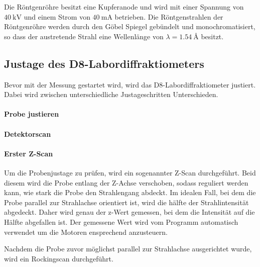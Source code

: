 Die Röntgenröhre besitzt eine Kupferanode und wird mit einer Spannung von $\SI{40}{\kilo\volt}$
und einem Strom von $\SI{40}{\milli\ampere}$ betrieben.
Die Röntgenstrahlen der Röntgenröhre werden durch den Göbel Spiegel
gebündelt und monochromatisiert,
so dass der austretende Strahl eine Wellenlänge von
$\lambda=\SI{1.54}{\angstrom}$ besitzt.


\subsection{Justage des D8-Labordiffraktiometers}
\label{subsec:justage}
Bevor mit der Messung gestartet wird, wird das D8-Labordiffraktiometer
justiert. Dabei wird zwischen unterschiedliche Justageschritten Unterschieden.


\paragraph{Probe justieren}


\paragraph{Detektorscan}


\paragraph{Erster Z-Scan}
Um die Probenjustage zu prüfen,
wird ein sogenannter Z-Scan durchgeführt.
Beid diesem wird die Probe entlang der Z-Achse verschoben,
sodass reguliert werden kann, wie stark die Probe den Strahlengang
abdeckt. Im idealen Fall, bei dem die Probe parallel zur Strahlachse
orientiert ist, wird die hälfte der Strahlintensität abgedeckt.
Daher wird genau der z-Wert gemessen, bei dem die Intensität auf
die Hälfte abgefallen ist. Der gemessene Wert wird vom Programm automatisch
verwendet um die Motoren ensprechend anzusteuern.


Nachdem die Probe zuvor möglichst parallel zur Strahlachse ausgerichtet wurde,
wird ein Rockingscan durchgeführt.   











